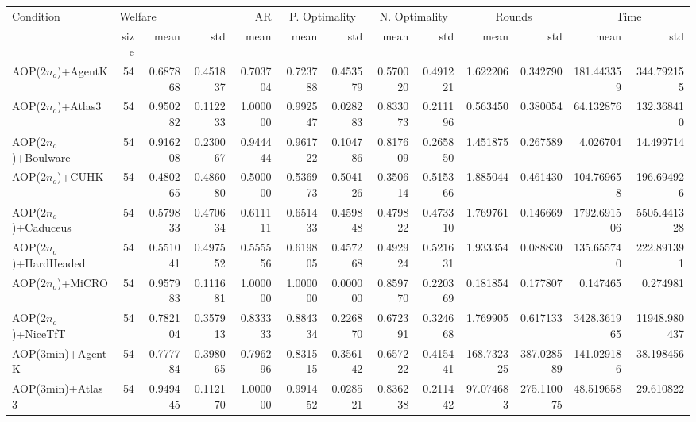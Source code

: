 \begin{tabular}{lrr|r|rr|rr|rr|rrr}
\toprule
                Condition & \multicolumn{3}{l}{Welfare} &       AR & \multicolumn{2}{c}{P. Optimality} & \multicolumn{2}{c}{N. Optimality} & \multicolumn{2}{c}{Rounds} & \multicolumn{2}{c}{Time} \\
                          &    size &     mean &      std &     mean &          mean &      std &          mean &      std &         mean &          std &        mean &          std \\
\midrule
      AOP($2 n_o$)+AgentK &      54 & 0.687868 & 0.451837 & 0.703704 &      0.723788 & 0.453579 &      0.570020 & 0.491221 &     1.622206 &     0.342790 &  181.443359 &   344.792155 \\
      AOP($2 n_o$)+Atlas3 &      54 & 0.950282 & 0.112233 & 1.000000 &      0.992547 & 0.028283 &      0.833073 & 0.211196 &     0.563450 &     0.380054 &   64.132876 &   132.368410 \\
    AOP($2 n_o$)+Boulware &      54 & 0.916208 & 0.230067 & 0.944444 &      0.961722 & 0.104786 &      0.817609 & 0.265850 &     1.451875 &     0.267589 &    4.026704 &    14.499714 \\
        AOP($2 n_o$)+CUHK &      54 & 0.480265 & 0.486080 & 0.500000 &      0.536973 & 0.504126 &      0.350614 & 0.515366 &     1.885044 &     0.461430 &  104.769658 &   196.694926 \\
    AOP($2 n_o$)+Caduceus &      54 & 0.579833 & 0.470634 & 0.611111 &      0.651433 & 0.459848 &      0.479822 & 0.473310 &     1.769761 &     0.146669 & 1792.691506 &  5505.441328 \\
  AOP($2 n_o$)+HardHeaded &      54 & 0.551041 & 0.497552 & 0.555556 &      0.619805 & 0.457268 &      0.492924 & 0.521631 &     1.933354 &     0.088830 &  135.655740 &   222.891391 \\
       AOP($2 n_o$)+MiCRO &      54 & 0.957983 & 0.111681 & 1.000000 &      1.000000 & 0.000000 &      0.859770 & 0.220369 &     0.181854 &     0.177807 &    0.147465 &     0.274981 \\
     AOP($2 n_o$)+NiceTfT &      54 & 0.782104 & 0.357913 & 0.833333 &      0.884334 & 0.226870 &      0.672391 & 0.324668 &     1.769905 &     0.617133 & 3428.361965 & 11948.980437 \\
         AOP(3min)+AgentK &      54 & 0.777784 & 0.398065 & 0.796296 &      0.831515 & 0.356142 &      0.657222 & 0.415441 &   168.732325 &   387.028589 &  141.029186 &    38.198456 \\
         AOP(3min)+Atlas3 &      54 & 0.949445 & 0.112170 & 1.000000 &      0.991452 & 0.028521 &      0.836238 & 0.211442 &    97.074683 &   275.110075 &   48.519658 &    29.610822 \\

\end{tabular}
